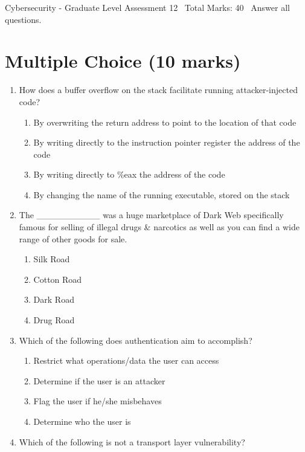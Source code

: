\documentclass[12pt]{article}
\begin{document}
\begin{center}
Cybersecurity - Graduate Level Assessment 12 \
Total Marks: 40 \
Answer all questions.
\end{center}

\section*{Multiple Choice (10 marks)}
\begin{enumerate}[label=\arabic*.]
\item How does a buffer overflow on the stack facilitate running attacker-injected code?
\begin{enumerate}[label=(\alph*)]
    \item By overwriting the return address to point to the location of that code
    \item By writing directly to the instruction pointer register the address of the code
    \item By writing directly to \%eax the address of the code
    \item By changing the name of the running executable, stored on the stack
\end{enumerate}
\item The \_\_\_\_\_\_\_\_\_\_ was a huge marketplace of Dark Web specifically famous for selling of illegal drugs \& narcotics as well as you can find a wide range of other goods for sale.
\begin{enumerate}[label=(\alph*)]
    \item Silk Road
    \item Cotton Road
    \item Dark Road
    \item Drug Road
\end{enumerate}
\item Which of the following does authentication aim to accomplish?
\begin{enumerate}[label=(\alph*)]
    \item Restrict what operations/data the user can access
    \item Determine if the user is an attacker
    \item Flag the user if he/she misbehaves
    \item Determine who the user is
\end{enumerate}
\item Which of the following is not a transport layer vulnerability?
\begin{enumerate}[label=(\alph*)]

\end{enumerate}
\end{enumerate}
\end{document}
